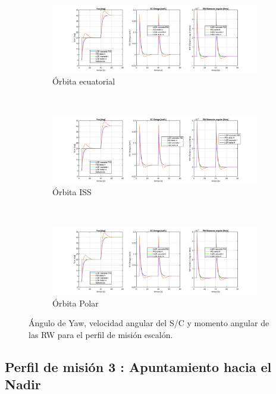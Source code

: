 \begin{figure}
	\centering
	\begin{subfigure}{1.2\linewidth}
		\includegraphics[width=\linewidth]{imagenes/resultados/Step/orbit_zero/Compilado.PNG}
		\caption{Órbita ecuatorial}
		\label{fig:step_zero}
	\end{subfigure}\\
	\begin{subfigure}{1.2\linewidth}
		\includegraphics[width=\linewidth]{imagenes/resultados/Step/orbit_iss/Compilado.PNG}
		\caption{Órbita ISS}
		\label{fig:step_iss}
	\end{subfigure}\\
	\begin{subfigure}{1.2\linewidth}
		\includegraphics[width=\linewidth]{imagenes/resultados/Step/orbit_polar/Compilado.PNG}
		\caption{Órbita Polar}
		\label{fig:step_polar}
	\end{subfigure}
	\caption{Ángulo de Yaw, velocidad angular del S/C y momento angular de las RW para el perfil de misión escalón.}
	\label{fig:step}
\end{figure}
\clearpage
\subsection{Perfil de misión 3 : Apuntamiento hacia el Nadir}

